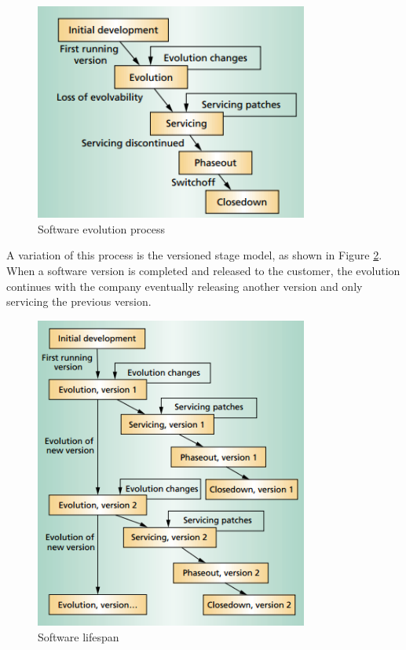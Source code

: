 \begin{figure}[ht!]
	\centering
	\includegraphics[width=0.8\textwidth]{images/lifespan-1.png}
	\caption{Software evolution process}
	\label{fig:lifespan-1}
\end{figure}

A variation of this process is the versioned stage model, as shown in Figure \ref{fig:lifespan-2}. When a software version is completed and released to the customer, the evolution continues with the company eventually releasing another version and only servicing the previous version. 

\begin{figure}[ht!]
	\centering
	\includegraphics[width=0.8\textwidth]{images/lifespan-2.png}
	\caption{Software lifespan}
	\label{fig:lifespan-2}
\end{figure}

